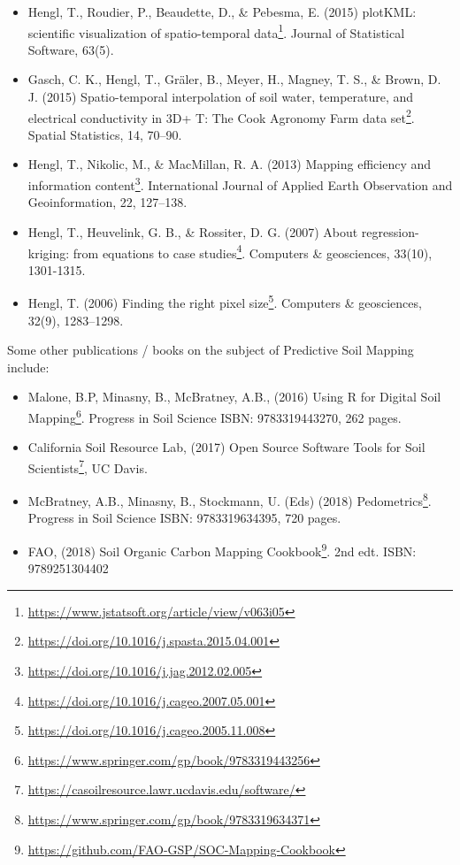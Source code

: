 \documentclass[11pt]{krantz}
\renewcommand{\href}[2]{#2\footnote{\url{#1}}}
\theoremstyle{definition}
\theoremstyle{definition}
\theoremstyle{definition}
\theoremstyle{remark}
\begin{document}
\begin{itemize}
  Shangguan, W., Hengl, T., de Jesus, J. M., Yuan, H., \& Dai, Y.
  (2017). \href{https://doi.org/10.1002/2016MS000686}{Mapping the global
  depth to bedrock for land surface modeling}. Journal of Advances in
  Modeling Earth Systems, 9(1), 65-88.
\item
  Hengl, T., Roudier, P., Beaudette, D., \& Pebesma, E. (2015)
  \href{https://www.jstatsoft.org/article/view/v063i05}{plotKML:
  scientific visualization of spatio-temporal data}. Journal of
  Statistical Software, 63(5).
\item
  Gasch, C. K., Hengl, T., Gräler, B., Meyer, H., Magney, T. S., \&
  Brown, D. J. (2015)
  \href{https://doi.org/10.1016/j.spasta.2015.04.001}{Spatio-temporal
  interpolation of soil water, temperature, and electrical conductivity
  in 3D+ T: The Cook Agronomy Farm data set}. Spatial Statistics, 14,
  70--90.
\item
  Hengl, T., Nikolic, M., \& MacMillan, R. A. (2013)
  \href{https://doi.org/10.1016/j.jag.2012.02.005}{Mapping efficiency
  and information content}. International Journal of Applied Earth
  Observation and Geoinformation, 22, 127--138.
\item
  Hengl, T., Heuvelink, G. B., \& Rossiter, D. G. (2007)
  \href{https://doi.org/10.1016/j.cageo.2007.05.001}{About
  regression-kriging: from equations to case studies}. Computers \&
  geosciences, 33(10), 1301-1315.
\item
  Hengl, T. (2006)
  \href{https://doi.org/10.1016/j.cageo.2005.11.008}{Finding the right
  pixel size}. Computers \& geosciences, 32(9), 1283--1298.
\end{itemize}

Some other publications / books on the subject of Predictive Soil
Mapping include:

\begin{itemize}
\item
  Malone, B.P, Minasny, B., McBratney, A.B., (2016)
  \href{https://www.springer.com/gp/book/9783319443256}{Using R for
  Digital Soil Mapping}. Progress in Soil Science ISBN: 9783319443270,
  262 pages.
\item
  California Soil Resource Lab, (2017)
  \href{https://casoilresource.lawr.ucdavis.edu/software/}{Open Source
  Software Tools for Soil Scientists}, UC Davis.
\item
  McBratney, A.B., Minasny, B., Stockmann, U. (Eds) (2018)
  \href{https://www.springer.com/gp/book/9783319634371}{Pedometrics}.
  Progress in Soil Science ISBN: 9783319634395, 720 pages.
\item
  FAO, (2018)
  \href{https://github.com/FAO-GSP/SOC-Mapping-Cookbook}{Soil Organic
  Carbon Mapping Cookbook}. 2nd edt. ISBN: 9789251304402
\end{itemize}
\end{document}
